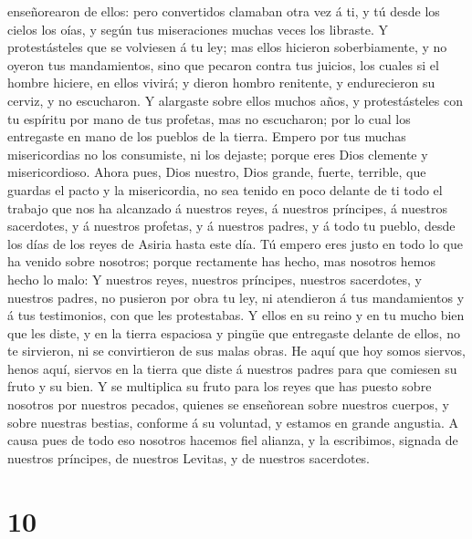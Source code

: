 enseñorearon de ellos: pero convertidos clamaban otra vez á ti, y tú
desde los cielos los oías, y según tus miseraciones muchas veces los
libraste.  Y protestásteles que se volviesen á tu ley; mas
ellos hicieron soberbiamente, y no oyeron tus mandamientos, sino que
pecaron contra tus juicios, los cuales si el hombre hiciere, en ellos
vivirá; y dieron hombro renitente, y endurecieron su cerviz, y no
escucharon.  Y alargaste sobre ellos muchos años, y
protestásteles con tu espíritu por mano de tus profetas, mas no
escucharon; por lo cual los entregaste en mano de los pueblos de la
tierra.  Empero por tus muchas misericordias no los
consumiste, ni los dejaste; porque eres Dios clemente y misericordioso.
 Ahora pues, Dios nuestro, Dios grande, fuerte, terrible,
que guardas el pacto y la misericordia, no sea tenido en poco delante de
ti todo el trabajo que nos ha alcanzado á nuestros reyes, á nuestros
príncipes, á nuestros sacerdotes, y á nuestros profetas, y á nuestros
padres, y á todo tu pueblo, desde los días de los reyes de Asiria hasta
este día.  Tú empero eres justo en todo lo que ha venido
sobre nosotros; porque rectamente has hecho, mas nosotros hemos hecho lo
malo:  Y nuestros reyes, nuestros príncipes, nuestros
sacerdotes, y nuestros padres, no pusieron por obra tu ley, ni
atendieron á tus mandamientos y á tus testimonios, con que les
protestabas.  Y ellos en su reino y en tu mucho bien que
les diste, y en la tierra espaciosa y pingüe que entregaste delante de
ellos, no te sirvieron, ni se convirtieron de sus malas obras.
 He aquí que hoy somos siervos, henos aquí, siervos en la
tierra que diste á nuestros padres para que comiesen su fruto y su bien.
 Y se multiplica su fruto para los reyes que has puesto
sobre nosotros por nuestros pecados, quienes se enseñorean sobre
nuestros cuerpos, y sobre nuestras bestias, conforme á su voluntad, y
estamos en grande angustia.  A causa pues de todo eso
nosotros hacemos fiel alianza, y la escribimos, signada de nuestros
príncipes, de nuestros Levitas, y de nuestros sacerdotes.

\hypertarget{section-9}{%
\section{10}\label{section-9}}

